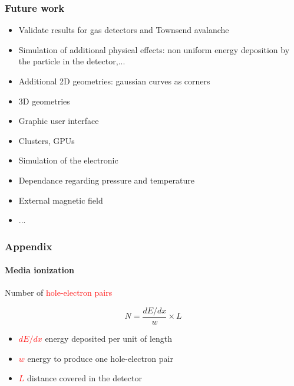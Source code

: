 \documentclass[14pt]{beamer}
\begin{document}
\begin{frame}
  \frametitle{Future work}

  \fontsize{13pt}{10}\selectfont


  \begin{itemize}
    \item Validate results for gas detectors and Townsend avalanche
    \item Simulation of additional physical effects: non uniform energy deposition by the
    particle in the detector,...
    \item Additional 2D geometries: gaussian curves as corners
    \item 3D geometries
    \item Graphic user interface
    \item Clusters, GPUs
    \item Simulation of the electronic
    \item Dependance regarding pressure and temperature
    \item External magnetic field
    \item ...
  \end{itemize}

\end{frame}

\begin{frame}
  \frametitle{Appendix}
  \framesubtitle{Media ionization}

  Number of \textcolor{red}{hole-electron pairs}

  \[N = \frac{dE/dx}{w} \times L\]

\begin{itemize}
  \item \textcolor{red}{$dE/dx$} energy deposited per unit of length
  \item \textcolor{red}{$w$} energy to produce one hole-electron pair
  \item \textcolor{red}{$L$} distance covered in the detector
\end{itemize}

\end{frame}
\end{document}
